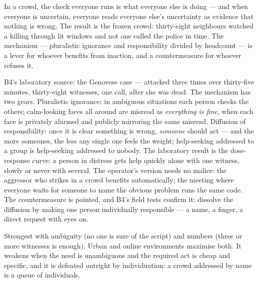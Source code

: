 \begin{core}
In a crowd, the check everyone runs is what everyone else is doing --- and when everyone is uncertain, everyone reads everyone else's uncertainty as evidence that nothing is wrong. The result is the frozen crowd: thirty-eight neighbours watched a killing through lit windows and not one called the police in time. The mechanism --- pluralistic ignorance and responsibility divided by headcount --- is a lever for whoever benefits from inaction, and a countermeasure for whoever refuses it.
\end{core}
\begin{mechanism}
B4's laboratory source: the Genovese case --- attacked three times over thirty-five minutes, thirty-eight witnesses, one call, after she was dead. The mechanism has two gears. Pluralistic ignorance: in ambiguous situations each person checks the others; calm-looking faces all around are misread as \emph{everything is fine}, when each face is privately alarmed and publicly mirroring the same misread. Diffusion of responsibility: once it is clear something is wrong, \emph{someone} should act --- and the more someones, the less any single one feels the weight; help-seeking addressed to a group is help-seeking addressed to nobody. The laboratory result is the dose-response curve: a person in distress gets help quickly alone with one witness, slowly or never with several. The operator's version needs no malice: the aggressor who strikes in a crowd benefits automatically; the meeting where everyone waits for someone to name the obvious problem runs the same code. The countermeasure is pointed, and B4's field tests confirm it: dissolve the diffusion by making one person individually responsible --- a name, a finger, a direct request with eyes on.
\end{mechanism}
\begin{conditions}
Strongest with ambiguity (no one is sure of the script) and numbers (three or more witnesses is enough). Urban and online environments maximise both. It weakens when the need is unambiguous and the required act is cheap and specific, and it is defeated outright by individuation: a crowd addressed by name is a queue of individuals.
\end{conditions}
